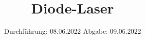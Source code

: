 

\subject{V14}
\title{Diode-Laser}
\date{%
  Durchführung: 08.06.2022
  \hspace{3em}
  Abgabe: 09.06.2022
}



\maketitle
\thispagestyle{empty}
\tableofcontents
\newpage





\nocite{*}
\printbibliography{}



